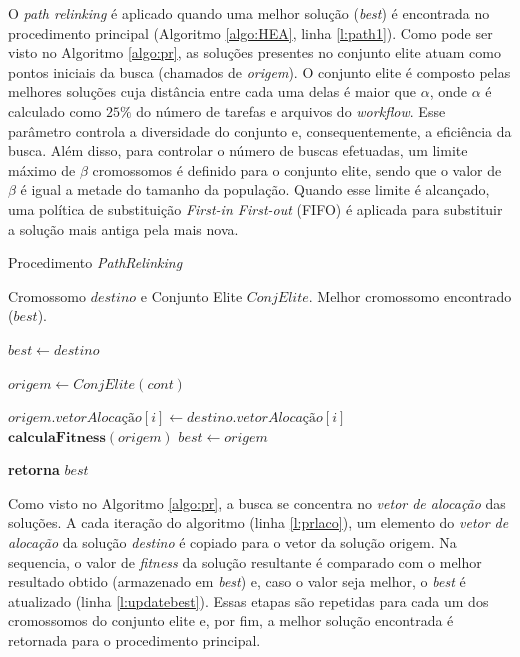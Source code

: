 O \textit{path relinking} é aplicado quando uma melhor solução (\textit{best}) é encontrada no procedimento principal (Algoritmo \ref{algo:HEA}, linha \ref{l:path1}). Como pode ser visto no Algoritmo \ref{algo:pr}, as soluções presentes no conjunto elite atuam como pontos iniciais da busca (chamados de \textit{origem}). O conjunto elite é composto pelas melhores soluções cuja distância entre cada uma delas é maior que $\alpha$, onde $\alpha$ é calculado como $25\%$ do número de tarefas e arquivos do \textit{workflow}. Esse parâmetro controla a diversidade do conjunto e, consequentemente, a eficiência da busca. Além disso, para controlar o número de buscas efetuadas, um limite máximo de $\beta$ cromossomos é definido para o conjunto elite, sendo que o valor de  $\beta$ é igual a metade do tamanho da população. Quando esse limite é alcançado, uma política de substituição \textit{First-in First-out} (FIFO) é aplicada para substituir a solução mais antiga pela mais nova. 
 
 \begin{algorithm}
 \caption{Procedimento \textit{PathRelinking}}\label{algo:pr}
 
 \begin{algorithmic}[1]
\Require Cromossomo $destino$ e Conjunto Elite $ConjElite$.
\Ensure Melhor cromossomo encontrado ($best$).
    
    \State $best \gets destino$
    
    
        \State $\textit{origem} \gets ConjElite(cont)$
                
         \label{l:prlaco}
                \State $origem.\textit{vetorAlocação}[i] \gets destino.\textit{vetorAlocação}[i]$
                \State $\textbf{calculaFitness}(origem)$ 
                    \State $best \gets origem$ \label{l:updatebest}
                \EndIf  
            \EndIf
        
        \EndFor
        
    \EndFor    
    \State \textbf{ retorna } $best$
\end{algorithmic}
\end{algorithm}


Como visto no Algoritmo \ref{algo:pr}, a busca se concentra no \textit{vetor de alocação} das soluções. A cada iteração do algoritmo (linha \ref{l:prlaco}), um elemento do \textit{vetor de alocação} da solução \textit{destino} é copiado para o vetor da solução origem. Na sequencia, o valor de \textit{fitness} da solução resultante é comparado com o melhor resultado obtido (armazenado em \textit{best}) e, caso o valor seja melhor, o \textit{best} é atualizado (linha \ref{l:updatebest}). Essas etapas são repetidas para cada um dos cromossomos do conjunto elite e, por fim, a melhor solução encontrada é retornada para o procedimento principal.
 
